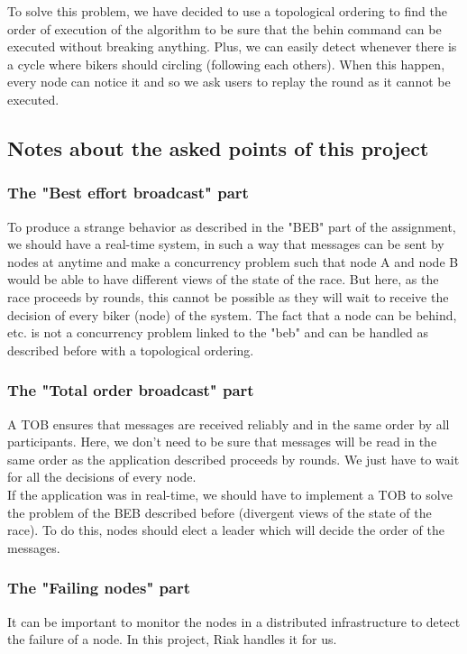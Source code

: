 \documentclass[a4paper, 11pt]{article}
\begin{document}
To solve this problem, we have decided to use a topological ordering to find the order of execution of the algorithm to be sure that the behin command can be executed without breaking anything. Plus, we can easily detect whenever there is a cycle where bikers should circling (following each others). When this happen, every node can notice it and so we ask users to replay the round as it cannot be executed. \\

\subsection{Notes about the asked points of this project}

\subsubsection{The "Best effort broadcast" part}
To produce a strange behavior as described in the "BEB" part of the assignment, we should have a real-time system, in such a way that messages can be sent by nodes at anytime and make a concurrency problem such that node A and node B would be able to have different views of the state of the race.
But here, as the race proceeds by rounds, this cannot be possible as they will wait to receive the decision of every biker (node) of the system.
The fact that a node can be behind, etc. is not a concurrency problem linked to the "beb" and can be handled as described before with a topological ordering.

\subsubsection{The "Total order broadcast" part}
A TOB ensures that messages are received reliably and in the same order by all participants.
Here, we don't need to be sure that messages will be read in the same order as the application described proceeds by rounds.
We just have to wait for all the decisions of every node. \\

If the application was in real-time, we should have to implement a TOB to solve the problem of the BEB described before (divergent views of the state of the race).
To do this, nodes should elect a leader which will decide the order of the messages.

\subsubsection{The "Failing nodes" part}
It can be important to monitor the nodes in a distributed infrastructure to detect the failure of a node.
In this project, Riak handles it for us. \\
\end{document}
